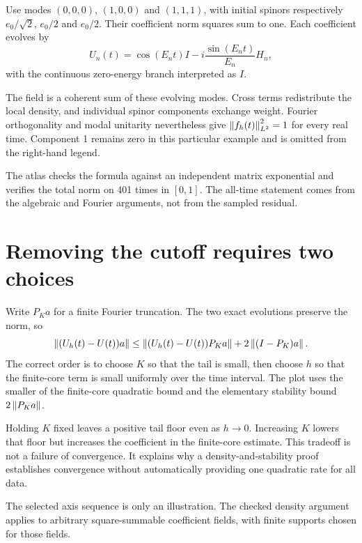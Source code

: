 Use modes $(0,0,0)$, $(1,0,0)$ and $(1,1,1)$, with initial spinors respectively $e_0/\sqrt2$, $e_0/2$ and $e_0/2$. Their coefficient norm squares sum to one. Each coefficient evolves by
\[
U_n(t)=\cos(E_nt)I-i\frac{\sin(E_nt)}{E_n}H_n,
\]
with the continuous zero-energy branch interpreted as $I$.

The field is a coherent sum of these evolving modes. Cross terms redistribute the local density, and individual spinor components exchange weight. Fourier orthogonality and modal unitarity nevertheless give $\left\lVert f_h(t)\right\rVert_{L^2}^2=1$ for every real time. Component 1 remains zero in this particular example and is omitted from the right-hand legend.

The atlas checks the formula against an independent matrix exponential and verifies the total norm on 401 times in $[0,1]$. The all-time statement comes from the algebraic and Fourier arguments, not from the sampled residual.


\clearpage
\section{Removing the cutoff requires two choices}

Write $P_Ka$ for a finite Fourier truncation. The two exact evolutions preserve the norm, so
\[
\left\lVert(U_h(t)-U(t))a\right\rVert
\leq\left\lVert(U_h(t)-U(t))P_Ka\right\rVert
       +2\left\lVert(I-P_K)a\right\rVert.
\]
The correct order is to choose $K$ so that the tail is small, then choose $h$ so that the finite-core term is small uniformly over the time interval. The plot uses the smaller of the finite-core quadratic bound and the elementary stability bound $2\left\lVert P_Ka\right\rVert$.

Holding $K$ fixed leaves a positive tail floor even as $h\to0$. Increasing $K$ lowers that floor but increases the coefficient in the finite-core estimate. This tradeoff is not a failure of convergence. It explains why a density-and-stability proof establishes convergence without automatically providing one quadratic rate for all data.

The selected axis sequence is only an illustration. The checked density argument applies to arbitrary square-summable coefficient fields, with finite supports chosen for those fields.


\clearpage
